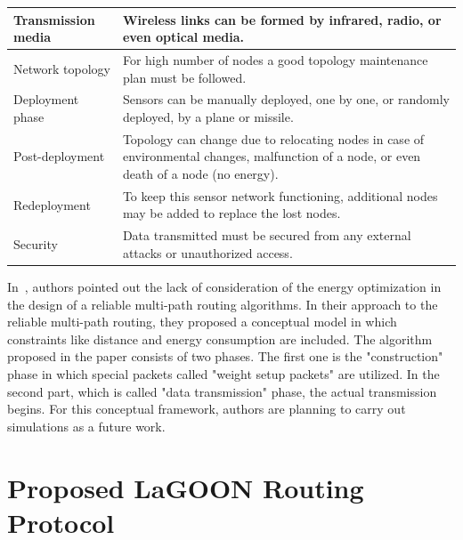 \documentclass[12pt, oneandhalf, chaparabic, sees, ms]{metu}
\begin{document}
\begin{table}[H]
\begin{center}
\begin{adjustbox}{max width=\textwidth}
\begin{tabular}{| l | l |}
Transmission media  &  {\parbox[t]{10cm}{Wireless links can be formed by infrared, radio, or even optical media.}} \tabularnewline \hline
Network topology  &  {\parbox[t]{10cm}{For high number of nodes a good topology maintenance plan must be followed.}} \tabularnewline \hline
Deployment phase &  {\parbox[t]{10cm}{Sensors can be manually deployed, one by one, or randomly deployed, by a plane or missile.}} \tabularnewline \hline
Post-deployment &  {\parbox[t]{10cm}{Topology can change due to relocating nodes in case of environmental changes, malfunction of a node, or even death of a node (no energy).}} \tabularnewline \hline
Redeployment  &  {\parbox[t]{10cm}{To keep this sensor network functioning, additional nodes may be added to replace the lost nodes.}} \tabularnewline \hline
Security   &  {\parbox[t]{10cm}{Data transmitted must be secured from any external attacks or unauthorized access.}} \tabularnewline \hline
\end{tabular}
\end{adjustbox}
\end{center}
\end{table}
\renewcommand{\arraystretch}{1}%
% 





\pagebreak




In~\cite{benaddy2017}, authors pointed out the lack of consideration of the energy optimization in the design of a reliable multi-path routing algorithms.
In their approach to the reliable multi-path routing, they proposed a conceptual model in which constraints like distance and energy consumption are included. 
The algorithm proposed in the paper 
consists of two phases. The first one is the "construction" phase in which special packets called "weight setup packets" are utilized. In the second part, 
which is called "data transmission" phase, the actual transmission begins. For this conceptual framework, authors are planning to carry out simulations
as a future work.





\newpage
\chapter{Proposed LaGOON Routing Protocol}\label{clagoon}
\end{document}
